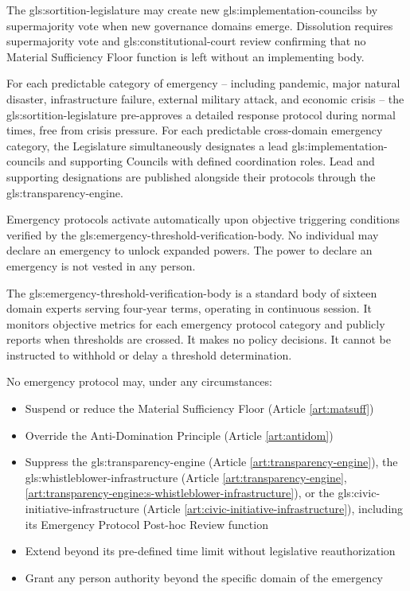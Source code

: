 The \gls{gls:sortition-legislature} may create new \gls{gls:implementation-councils}s by supermajority vote when new governance domains emerge. Dissolution requires supermajority vote and \gls{gls:constitutional-court} review confirming that no Material Sufficiency Floor function is left without an implementing body.


For each predictable category of emergency -- including pandemic, major natural disaster, infrastructure failure, external military attack, and economic crisis -- the \gls{gls:sortition-legislature} pre-approves a detailed response protocol during normal times, free from crisis pressure. For each predictable cross-domain emergency category, the Legislature simultaneously designates a lead \gls{gls:implementation-councils} and supporting Councils with defined coordination roles. Lead and supporting designations are published alongside their protocols through the \gls{gls:transparency-engine}.

Emergency protocols activate automatically upon objective triggering conditions verified by the \gls{gls:emergency-threshold-verification-body}. No individual may declare an emergency to unlock expanded powers. The power to declare an emergency is not vested in any person.

The \gls{gls:emergency-threshold-verification-body} is a standard body of sixteen domain experts serving four-year terms, operating in continuous session. It monitors objective metrics for each emergency protocol category and publicly reports when thresholds are crossed. It makes no policy decisions. It cannot be instructed to withhold or delay a threshold determination.

No emergency protocol may, under any circumstances:
\begin{itemize}
  \item Suspend or reduce the Material Sufficiency Floor (Article \ref{art:matsuff})
  \item Override the Anti-Domination Principle (Article \ref{art:antidom})
  \item Suppress the \gls{gls:transparency-engine} (Article \ref{art:transparency-engine}), the \gls{gls:whistleblower-infrastructure} (Article \ref{art:transparency-engine}, \ref{art:transparency-engine:s-whistleblower-infrastructure}), or the \gls{gls:civic-initiative-infrastructure} (Article \ref{art:civic-initiative-infrastructure}), including its Emergency Protocol Post-hoc Review function
  \item Extend beyond its pre-defined time limit without legislative reauthorization
  \item Grant any person authority beyond the specific domain of the emergency
\end{itemize}


